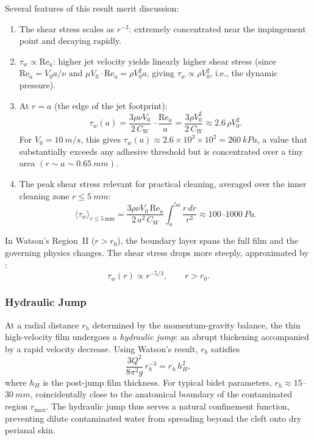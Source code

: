 \documentclass[aps,prfluids,reprint,amsmath,amssymb,floatfix]{revtex4-2}
\newcommand{\Rey}{\mathrm{Re}}
\begin{document}
Several features of this result merit discussion:
\begin{enumerate}[leftmargin=*, label=(\roman*)]
    \item The shear stress scales as $r^{-3}$: extremely concentrated near
    the impingement point and decaying rapidly.
    \item $\tau_w \propto \Rey_a$: higher jet velocity yields linearly higher
    shear stress (since $\Rey_a = V_0 a/\nu$ and $\mu V_0 \cdot \Rey_a = \rho V_0^2 a$,
    giving $\tau_w \propto \rho V_0^2$, i.e., the dynamic pressure).
    \item At $r = a$ (the edge of the jet footprint):
    \begin{equation}
        \tau_w(a) = \frac{3\rho\nu V_0}{2\,C_W}\,\cdot\frac{\Rey_a}{a}
        = \frac{3\rho V_0^2}{2\,C_W} \approx 2.6\,\rho V_0^2.
        \label{eq:taumax}
    \end{equation}
    For $V_0 = \SI{10}{m/s}$, this gives
    $\tau_w(a) \approx 2.6 \times 10^3 \times 10^2 = \SI{260}{kPa}$,
    a value that substantially exceeds any adhesive threshold but is
    concentrated over a tiny area $(r \sim a \sim \SI{0.65}{mm})$.
    \item The peak shear stress relevant for practical cleaning, averaged
    over the inner cleaning zone $r \leq \SI{5}{mm}$:
    \begin{equation}
        \langle\tau_w\rangle_{r \leq 5\,\text{mm}}
        = \frac{3\rho\nu V_0\,\Rey_a}{2\,a^2\,C_W}\int_{a}^{5a}
        \frac{r\,dr}{r^3}
        \approx 100\text{--}\SI{1000}{Pa}.
        \label{eq:avgshear}
    \end{equation}
\end{enumerate}

In Watson's Region~II ($r > r_0$), the boundary layer spans the full film
and the governing physics changes. The shear stress drops more steeply,
approximated by \citep{Phares2000}:
\begin{equation}
    \tau_w(r) \propto r^{-5/3}, \qquad r > r_0.
    \label{eq:tauII}
\end{equation}

\subsubsection{Hydraulic Jump}

At a radial distance $r_h$ determined by the momentum-gravity balance,
the thin high-velocity film undergoes a \emph{hydraulic jump}: an abrupt
thickening accompanied by a rapid velocity decrease. Using Watson's result,
$r_h$ satisfies
\begin{equation}
    \frac{3Q^2}{8\pi^2 g}\,r_h^{-3} = r_h\,h_H^2,
    \label{eq:hjump}
\end{equation}
where $h_H$ is the post-jump film thickness. For typical bidet parameters,
$r_h \approx 15$--$\SI{30}{mm}$, coincidentally close to the anatomical
boundary of the contaminated region $r_\mathrm{max}$. The hydraulic jump
thus serves a natural confinement function, preventing dilute contaminated
water from spreading beyond the cleft onto dry perianal skin.
\end{document}
